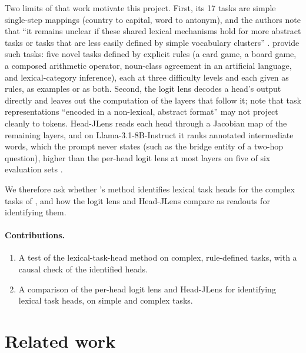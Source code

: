 \documentclass[11pt,a4paper]{article}
\begin{document}
Two limits of that work motivate this project. First, its 17 tasks are simple single-step mappings (country to capital, word to antonym), and the authors note that ``it remains unclear if these shared lexical mechanisms hold for more abstract tasks or tasks that are less easily defined by simple vocabulary clusters'' \citep[Sec.~4]{yang2026shared}. \citet{fu2026rules} provide such tasks: five novel tasks defined by explicit rules (a card game, a board game, a composed arithmetic operator, noun-class agreement in an artificial language, and lexical-category inference), each at three difficulty levels and each given as rules, as examples or as both. Second, the logit lens decodes a head's output directly and leaves out the computation of the layers that follow it; \citet[Sec.~4]{yang2026shared} note that task representations ``encoded in a non-lexical, abstract format'' may not project cleanly to tokens. Head-JLens reads each head through a Jacobian map of the remaining layers, and on Llama-3.1-8B-Instruct it ranks annotated intermediate words, which the prompt never states (such as the bridge entity of a two-hop question), higher than the per-head logit lens at most layers on five of six evaluation sets \citep[Sec.~3]{merlo2026headjlens}.

We therefore ask whether \citeauthor{yang2026shared}'s method identifies lexical task heads for the complex tasks of \citet{fu2026rules}, and how the logit lens and Head-JLens compare as readouts for identifying them.

\paragraph{Contributions.}
\begin{enumerate}
\item A test of the lexical-task-head method on complex, rule-defined tasks, with a causal check of the identified heads.
\item A comparison of the per-head logit lens and Head-JLens for identifying lexical task heads, on simple and complex tasks.
\end{enumerate}

\section{Related work}\label{sec:background}
\end{document}
